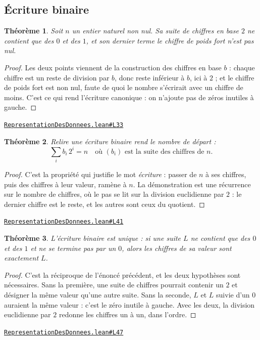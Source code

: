 \documentclass[11pt,a4paper]{article}
\theoremstyle{definition}
\theoremstyle{plain}
\newtheorem{theoreme}{Théorème}
\newcommand{\source}[2]{\par\smallskip\noindent\hfill{\footnotesize\href{#1}{\texttt{#2}}}\par\smallskip}
\begin{document}
\subsection{Écriture binaire}

\begin{theoreme}
Soit $n$ un entier naturel non nul. Sa suite de chiffres en base $2$ ne contient que
des $0$ et des $1$, et son dernier terme \textemdash{} le chiffre de poids fort \textemdash{}
n'est pas nul.
\end{theoreme}
\begin{proof}
Les deux points viennent de la construction des chiffres en base $b$ : chaque chiffre
est un reste de division par $b$, donc reste inférieur à $b$, ici à $2$ ; et le chiffre de
poids fort est non nul, faute de quoi le nombre s'écrirait avec un chiffre de moins.
C'est ce qui rend l'écriture canonique : on n'ajoute pas de zéros inutiles à gauche.
\end{proof}
\source{https://github.com/Commutator-IO/learn-lean/blob/main/courses/02-lycee/11-informatique-nsi/RepresentationDesDonnees.lean\#L33}{RepresentationDesDonnees.lean\#L33}

\begin{theoreme}
Relire une écriture binaire rend le nombre de départ :
\[ \sum_{i} b_i\, 2^i = n \quad \text{où } (b_i) \text{ est la suite des chiffres de } n . \]
\end{theoreme}
\begin{proof}
C'est la propriété qui justifie le mot \emph{écriture} : passer de $n$ à ses chiffres,
puis des chiffres à leur valeur, ramène à $n$. La démonstration est une récurrence sur le
nombre de chiffres, où le pas se lit sur la division euclidienne par $2$ : le dernier
chiffre est le reste, et les autres sont ceux du quotient.
\end{proof}
\source{https://github.com/Commutator-IO/learn-lean/blob/main/courses/02-lycee/11-informatique-nsi/RepresentationDesDonnees.lean\#L41}{RepresentationDesDonnees.lean\#L41}

\begin{theoreme}
L'écriture binaire est unique : si une suite $L$ ne contient que des $0$ et des $1$ et
ne se termine pas par un $0$, alors les chiffres de sa valeur sont exactement $L$.
\end{theoreme}
\begin{proof}
C'est la réciproque de l'énoncé précédent, et les deux hypothèses sont nécessaires. Sans
la première, une \og{} suite de chiffres \fg{} pourrait contenir un $2$ et désigner la
même valeur qu'une autre suite. Sans la seconde, $L$ et $L$ suivie d'un $0$ auraient la
même valeur : c'est le zéro inutile à gauche. Avec les deux, la division euclidienne par
$2$ redonne les chiffres un à un, dans l'ordre.
\end{proof}
\source{https://github.com/Commutator-IO/learn-lean/blob/main/courses/02-lycee/11-informatique-nsi/RepresentationDesDonnees.lean\#L47}{RepresentationDesDonnees.lean\#L47}
\end{document}
